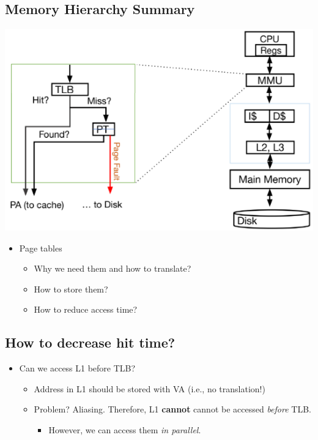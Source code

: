 \documentclass[10pt]{article}
\begin{document}
\subsection*{Memory Hierarchy Summary}
\begin{center}
    \includegraphics*[scale=0.8]{W7_17.png}
\end{center}
\begin{itemize}
    \item Page tables
    \begin{itemize}
        \item Why we need them and how to translate?
        \item How to store them?
        \item How to reduce access time?
    \end{itemize}
\end{itemize}
\subsection*{How to decrease hit time?}
\begin{itemize}
    \item Can we access L1 before TLB?
    \begin{itemize}
        \item Address in L1 should be stored with VA (i.e., no translation!)
        \item Problem?  Aliasing.  Therefore, L1 \textbf{cannot} cannot be accessed \textit{before} TLB.
        \begin{itemize}
            \item However, we can access them \textit{in parallel}.
        \end{itemize}
    \end{itemize}
\end{itemize}
\end{document}
